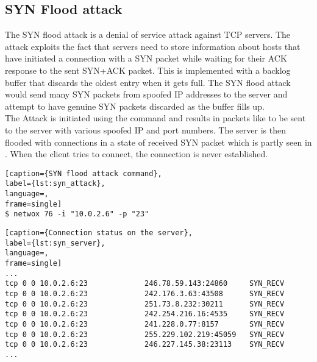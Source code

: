 \subsection{SYN Flood attack}
The SYN flood attack is a denial of service attack against TCP servers. The attack exploits the fact that servers need to store information about hosts that have initiated a connection with a SYN packet while waiting for their ACK response to the sent SYN+ACK packet. This is implemented with a backlog buffer that discards the oldest entry when it gets full. The SYN flood attack would send many SYN packets from spoofed IP addresses to the server and attempt to have genuine SYN packets discarded as the buffer fills up. \\
The Attack is initiated using the command  and results in packets like  to be sent to the server with various spoofed IP and port numbers. The server is then flooded with connections in a state of received SYN packet which is partly seen in . When the client tries to connect, the connection is never established.

\begin{minipage}{\linewidth}
\begin{lstlisting}[caption={SYN flood attack command},
label={lst:syn_attack},
language=,
frame=single]
$ netwox 76 -i "10.0.2.6" -p "23"
\end{lstlisting}
\end{minipage}

\begin{minipage}{\linewidth}
\begin{lstlisting}[caption={Connection status on the server},
label={lst:syn_server},
language=,
frame=single]
...
tcp 0 0 10.0.2.6:23             246.78.59.143:24860     SYN_RECV   
tcp 0 0 10.0.2.6:23             242.176.3.63:43508      SYN_RECV   
tcp 0 0 10.0.2.6:23             251.73.8.232:30211      SYN_RECV   
tcp 0 0 10.0.2.6:23             242.254.216.16:4535     SYN_RECV   
tcp 0 0 10.0.2.6:23             241.228.0.77:8157       SYN_RECV   
tcp 0 0 10.0.2.6:23             255.229.102.219:45059   SYN_RECV   
tcp 0 0 10.0.2.6:23             246.227.145.38:23113    SYN_RECV 
...
\end{lstlisting}
\end{minipage} 

